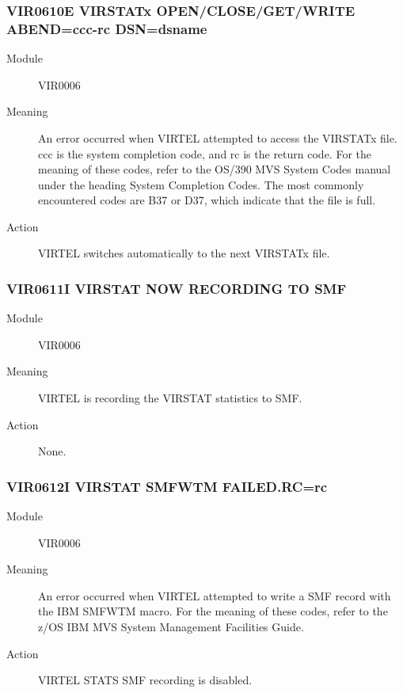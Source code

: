 \documentclass[letterpaper,10pt,english]{sphinxmanual}
\begin{document}
\subsubsection{VIR0610E VIRSTATx OPEN/CLOSE/GET/WRITE ABEND=ccc-rc DSN=dsname}
\label{\detokenize{messages:vir0610e-virstatx-open-close-get-write-abend-ccc-rc-dsn-dsname}}\begin{description}
\item[{Module}] \leavevmode
VIR0006

\item[{Meaning}] \leavevmode
An error occurred when VIRTEL attempted to access the VIRSTATx file. ccc is the system completion code, and rc is the return code. For the meaning of these codes, refer to the OS/390 MVS System Codes manual under the heading System Completion Codes. The most commonly encountered codes are B37 or D37, which indicate that the file is full.

\item[{Action}] \leavevmode
VIRTEL switches automatically to the next VIRSTATx file.

\end{description}


\subsubsection{VIR0611I VIRSTAT NOW RECORDING TO SMF}
\label{\detokenize{messages:vir0611i-virstat-now-recording-to-smf}}\begin{description}
\item[{Module}] \leavevmode
VIR0006

\item[{Meaning}] \leavevmode
VIRTEL is recording the VIRSTAT statistics to SMF.

\item[{Action}] \leavevmode
None.

\end{description}


\subsubsection{VIR0612I VIRSTAT SMFWTM FAILED.RC=rc}
\label{\detokenize{messages:vir0612i-virstat-smfwtm-failed-rc-rc}}\begin{description}
\item[{Module}] \leavevmode
VIR0006

\item[{Meaning}] \leavevmode
An error occurred when VIRTEL attempted to write a SMF record with the IBM SMFWTM macro. For the meaning of these codes, refer to the z/OS IBM MVS System Management Facilities Guide.

\item[{Action}] \leavevmode
VIRTEL STATS SMF recording is disabled.

\end{description}
\end{document}
